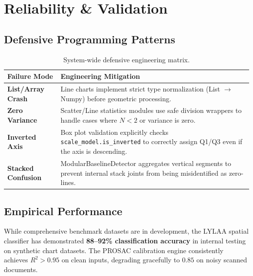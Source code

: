 \documentclass[11pt, a4paper]{report}
\begin{document}
\chapter{Reliability \& Validation}

\section{Defensive Programming Patterns}

\begin{table}[H]
\centering
\begin{tabular}{@{}p{}p{}@{}}
\toprule
\textbf{Failure Mode} & \textbf{Engineering Mitigation} \\
\midrule
\textbf{List/Array Crash} & Line charts implement strict type normalization (List $\to$ Numpy) before geometric processing. \\
\midrule
\textbf{Zero Variance} & Scatter/Line statistics modules use safe division wrappers to handle cases where $N < 2$ or variance is zero. \\
\midrule
\textbf{Inverted Axis} & Box plot validation explicitly checks \texttt{scale\_model.is\_inverted} to correctly assign Q1/Q3 even if the axis is descending. \\
\midrule
\textbf{Stacked Confusion} & ModularBaselineDetector aggregates vertical segments to prevent internal stack joints from being misidentified as zero-lines. \\
\bottomrule
\end{tabular}
\caption{System-wide defensive engineering matrix.}
\end{table}

\section{Empirical Performance}
While comprehensive benchmark datasets are in development, the LYLAA spatial classifier has demonstrated \textbf{88--92\% classification accuracy} in internal testing on synthetic chart datasets. The PROSAC calibration engine consistently achieves $R^2 > 0.95$ on clean inputs, degrading gracefully to $0.85$ on noisy scanned documents.
\end{document}
